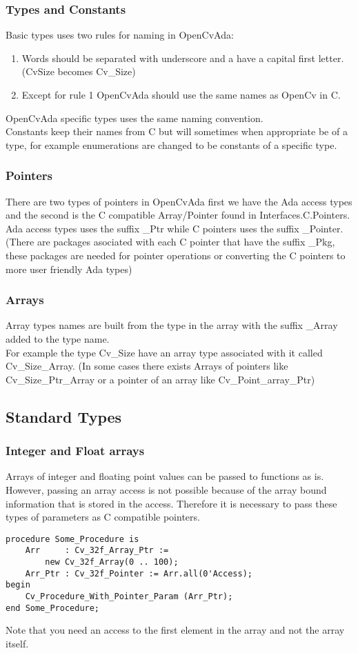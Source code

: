 \subsubsection{Types and Constants}
Basic types uses two rules for naming in OpenCvAda:
\begin{enumerate}
\item Words should be separated with underscore and a have a capital first letter. (CvSize becomes Cv_Size)
\item Except for rule 1 OpenCvAda should use the same names as OpenCv in C.
\end{enumerate}
OpenCvAda specific types uses the same naming convention.
\\
Constants keep their names from C but will sometimes when appropriate be of a type, for example enumerations are changed to be constants of a specific type.
\subsubsection{Pointers}
There are two types of pointers in OpenCvAda first we have the Ada access types and the second is the C compatible Array/Pointer found in Interfaces.C.Pointers.
\\
Ada access types uses the suffix _Ptr while C pointers uses the suffix _Pointer. (There are packages asociated with each C pointer that have the suffix _Pkg, these packages are needed for pointer operations or converting the C pointers to more user friendly Ada types)
\subsubsection{Arrays}
Array types names are built from the type in the array with the suffix _Array added to the type name.
\\
For example the type Cv_Size have an array type associated with it called Cv_Size_Array. (In some cases there exists Arrays of pointers like Cv_Size_Ptr_Array or a pointer of an array like Cv_Point_array_Ptr)
\subsection{Standard Types}
\subsubsection{Integer and Float arrays}
Arrays of integer and floating point values can be passed to functions as is. However, passing an array access is not possible because of the array bound information that is stored in the access. Therefore it is necessary to pass these types of parameters as C compatible pointers.
\begin{lstlisting}
procedure Some_Procedure is
	Arr     : Cv_32f_Array_Ptr := 
		new Cv_32f_Array(0 .. 100);
	Arr_Ptr : Cv_32f_Pointer := Arr.all(0'Access);
begin
	Cv_Procedure_With_Pointer_Param (Arr_Ptr);
end Some_Procedure;
\end{lstlisting}
Note that you need an access to the first element in the array and not the array itself.
